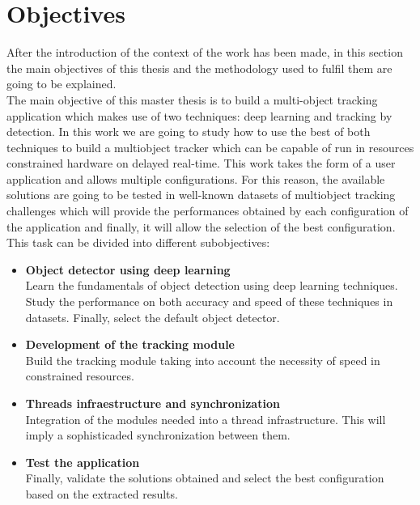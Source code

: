 \section{Objectives}
After the introduction of the context of the work has been made, in this section the main objectives of this thesis and the methodology used to fulfil them are going to be explained.
\\
The main objective of this master thesis is to build a multi-object tracking application which makes use of two techniques: deep learning and tracking by detection. In this work we are going to study how to use the best of both techniques to build a multiobject tracker which can be capable of run in resources constrained hardware on delayed real-time. This work takes the form of a user application and allows multiple configurations. For this reason, the available solutions are going to be tested in well-known datasets of multiobject tracking challenges which will provide the performances obtained by each configuration of the application and finally, it will allow the selection of the best configuration.\\
This task can be divided into different subobjectives:
\begin{itemize}
\item \textbf{Object detector using deep learning}\\
Learn the fundamentals of object detection using deep learning techniques. Study the performance on both accuracy and speed of these techniques in datasets. Finally, select the default object detector.
\item \textbf{Development of the tracking module}\\
Build the tracking module taking into account the necessity of speed in constrained resources.
\item \textbf{Threads infraestructure and synchronization}\\
Integration of the modules needed into a thread infrastructure. This will imply a sophisticaded synchronization between them.
\item \textbf{Test the application}\\
Finally, validate the solutions obtained and select the best configuration based on the extracted results.
\end{itemize}

